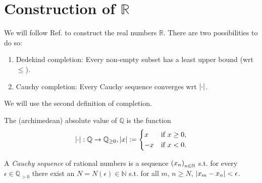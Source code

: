 \section{Construction of $\mathbb R$}\label{app:completion_Q}

We will follow Ref. \cite{src:completion_of_Q} to construct the real numbers $\mathbb R$. There are two possibilities to do so:
\begin{enumerate}
	\item Dedekind completion: Every non-empty subset has a least upper bound (wrt $\leq$).
	\item Cauchy completion: Every Cauchy sequence converges wrt $\abs{\cdot}$.
\end{enumerate}

We will use the second definition of completion.

\begin{defn}
	The (archimedean) absolute value of $\mathbb Q$ is the function 
	\begin{align}
		\abs{\cdot}: \mathbb Q\to\mathbb{Q}_{\geq 0}, \abs{x} := \begin{cases}
			x &\text{if}\ x \geq 0,
			\\ -x &\text{if}\ x < 0.
		\end{cases}
	\end{align}
\end{defn}

\begin{defn}
	A \textit{Cauchy sequence} of rational numbers is a sequence $\seq[x_n]$ s.t. for every $\epsilon\in\mathbb{Q}_{> 0}$ there exist an $N = N(\epsilon)\in\mathbb N$ s.t. for all $m$, $n\geq N$, $\abs{x_m - x_n} < \epsilon$.
\end{defn}